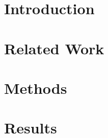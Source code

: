 \documentclass[letterpaper]{article} %
\begin{document}
\section{Introduction}


\section{Related Work}


\section{Methods}


\section{Results}



\end{document}
